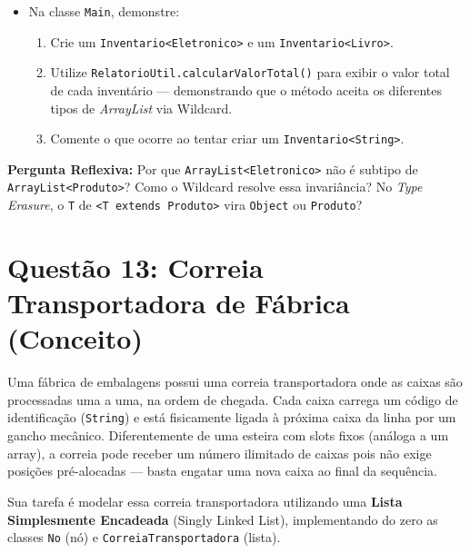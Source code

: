 \documentclass[12pt, a4paper]{article}
\begin{document}
\begin{itemize}
\begin{itemize}
        \item \texttt{static double calcularValorTotal}\\ \texttt{(ArrayList<? extends Produto> lista)} — retorna a soma dos preços.
    \end{itemize}
    \item Na classe \texttt{Main}, demonstre:
    \begin{enumerate}
        \item Crie um \texttt{Inventario<Eletronico>} e um \texttt{Inventario<Livro>}.
        \item Utilize \texttt{RelatorioUtil.calcularValorTotal()} para exibir o valor total de cada inventário — demonstrando que o método aceita os diferentes tipos de \textit{ArrayList} via Wildcard.
        \item Comente o que ocorre ao tentar criar um \texttt{Inventario<String>}.
    \end{enumerate}
\end{itemize}

\textbf{Pergunta Reflexiva:} Por que \texttt{ArrayList<Eletronico>} não é subtipo de \texttt{ArrayList<Produto>}? Como o Wildcard resolve essa invariância? No \textit{Type Erasure}, o \texttt{T} de \texttt{<T extends Produto>} vira \texttt{Object} ou \texttt{Produto}?


\section*{Questão 13: Correia Transportadora de Fábrica (Conceito)}
Uma fábrica de embalagens possui uma correia transportadora onde as caixas são processadas uma a uma, na ordem de chegada. Cada caixa carrega um código de identificação (\texttt{String}) e está fisicamente ligada à próxima caixa da linha por um gancho mecânico. Diferentemente de uma esteira com slots fixos (análoga a um array), a correia pode receber um número ilimitado de caixas pois não exige posições pré-alocadas — basta engatar uma nova caixa ao final da sequência.

Sua tarefa é modelar essa correia transportadora utilizando uma \textbf{Lista Simplesmente Encadeada} (Singly Linked List), implementando do zero as classes \texttt{No} (nó) e \texttt{CorreiaTransportadora} (lista).
\end{document}
